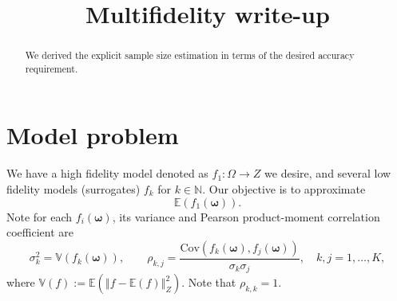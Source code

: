 \documentclass[final,3p,times,11pt]{elsarticle}
\begin{document}
\begin{frontmatter}
\title{Multifidelity write-up}
\begin{abstract}
We derived the explicit sample size estimation in terms of the desired accuracy requirement.
\end{abstract}
\end{frontmatter}



\section{Model problem}\label{sec:Problem_setup}
We have a high fidelity model denoted as $f_1: \Omega \rightarrow Z$ we desire, and several low fidelity models (surrogates) $f_k$ for $k\in \mathbb{N}$. Our objective is to approximate 
\[
\mathbb{E}\left(f_1(\boldsymbol{\omega})\right).
\]
Note for each $f_i(\boldsymbol{\omega})$, its variance and Pearson product-moment correlation coefficient are 
\begin{equation*}
    \sigma_k^2 = \mathbb{V}\left(f_k(\boldsymbol{\omega})\right),\qquad \rho_{k,j} = \frac{\text{Cov}\left(f_k(\boldsymbol{\omega}),f_j(\boldsymbol{\omega})\right)}{\sigma_k\sigma_j}, \quad k,j=1,\dots, K,
\end{equation*}
where $\mathbb{V}(f) := \mathbb{E}\left(\left\Vert f - \mathbb{E}(f)\right\Vert_Z^2\right)$. Note that $\rho_{k,k}=1$.
\end{document}
